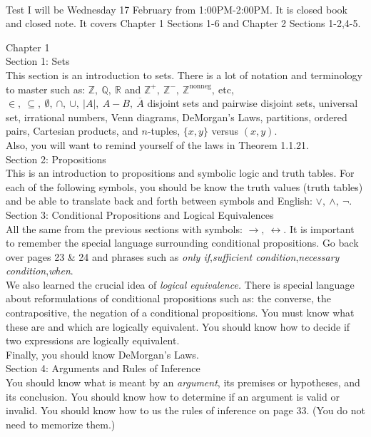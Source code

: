 \documentclass[12pt]{article}
\def\RR{{\mathbb R}}
\def\ZZ{{\mathbb Z}}
\def\QQ{{\mathbb Q}}
\begin{document}
\thispagestyle{fancy}
\quad\\

Test I will be Wednesday 17 February from 1:00PM-2:00PM. It is closed book and closed note. It covers Chapter 1 Sections 1-6 and Chapter 2 Sections 1-2,4-5. \\

\hrulefill

Chapter 1 \\

Section 1: Sets\\
This section is an introduction to sets. There is a lot of notation and terminology to master such as: $\ZZ,~\QQ,~\RR$ and $\ZZ^+,~\ZZ^-,~\ZZ^{\text{nonneg}},~$etc, $\in,~\subseteq,~\emptyset,~\cap,~\cup,~|A|,~A-B, ~\overline{A}$ disjoint sets and pairwise disjoint sets, universal set, irrational numbers, Venn diagrams, DeMorgan's Laws, partitions, ordered pairs, Cartesian products, and $n$-tuples, $\{x,y\}$ versus $(x,y).$\\
Also, you will want to remind  yourself of the laws in Theorem 1.1.21.\\

Section 2: Propositions\\
This is an introduction to propositions and symbolic logic and truth tables. For each of the following symbols, you should be know the truth values (truth tables) and be able to translate back and forth between symbols and English: $\vee,~\wedge,~\neg.$\\

Section 3: Conditional Propositions and Logical Equivalences\\
All the same from the previous sections with symbols: $\rightarrow,~\leftrightarrow.$ It is important to remember the special language surrounding conditional propositions. Go back over pages 23 \& 24 and phrases such as \emph{only if},\emph{sufficient condition},\emph{necessary condition},\emph{when}. \\
We also learned the crucial idea of \emph{logical equivalence.} There is special language about reformulations of conditional propositions such as: the converse, the contrapositive, the negation of a conditional propositions. You must know what these are and which are logically equivalent. You should know how to decide if two expressions are logically equivalent.\\
Finally, you should know DeMorgan's Laws.\\

Section 4: Arguments and Rules of Inference\\
You should know what is meant by an \emph{argument}, its premises or hypotheses, and its conclusion. You should know how to determine if an argument is valid or invalid. You should know how to us the rules of inference on page 33. (You do not need to memorize them.)\\
\end{document}
